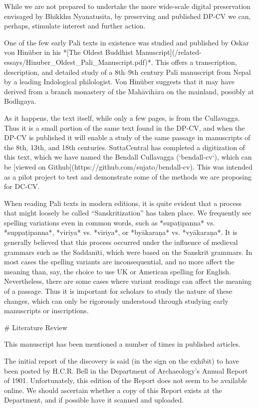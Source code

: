 \documentclass[11pt, openany,a5paper]{article}
\begin{document}
\begin{markdown}
While we are not prepared to undertake the more wide-scale digital preservation envisaged by Bhikkhu Nyanatusita, by preserving and published DP-CV we can, perhaps, stimulate interest and further action.

One of the few early Pali texts in existence was studied and published by Oskar von Hinüber in his *[The Oldest Buddhist Manuscript](/related-essays/Hinuber_Oldest_Pali_Manuscript.pdf)*. This offers a transcription, description, and detailed study of a 8th–9th century Pali manuscript from Nepal by a leading Indological philologist. Von Hinüber suggests that it may have derived from a branch monastery of the Mahāvihāra on the mainland, possibly at Bodhgaya.

As it happens, the text itself, while only a few pages, is from the Cullavagga. Thus it is a small portion of the same text found in the DP-CV, and when the DP-CV is published it will enable a study of the  same passage in manuscripts of the 8th, 13th, and 18th centuries. SuttaCentral has completed a digitization of this text, which we have named the Bendall Cullavagga (`bendall-cv`), which can be [viewed on Github](https://github.com/sujato/bendall-cv). This was intended as a pilot project to test and demonstrate some of the methods we are proposing for DC-CV.

When reading Pali texts in modern editions, it is quite evident that a process that might loosely be called “Sanskritization” has taken place. We frequently see spelling variations even in common words, such as *supaṭipanna* vs. *suppaṭipanna*, *viriya* vs. *vīriya*, or *byākaraṇa* vs. *vyākaraṇa*. It is generally believed that this process occurred under the influence of medieval grammars such as the Saddanīti, which were based on the Sanskrit grammars. In most cases the spelling variants are inconsequential, and no more affect the meaning than, say, the choice to use UK or American spelling for English. Nevertheless, there are some cases where variant readings can affect the meaning of a passage. Thus it is important for scholars to study the nature of these changes, which can only be rigorously understood through studying early manuscripts or inscriptions.

# Literature Review

This manuscript has been mentioned a number of times in published articles.

The initial report of the discovery is said (in the sign on the exhibit) to have been posted by H.C.R. Bell in the Department of Archaeology’s Annual Report of 1901. Unfortunately, this edition of the Report does not seem to be available online. We should ascertain whether a copy of this Report exists at the Department, and if possible have it scanned and uploaded.


\end{markdown}
\end{document}
